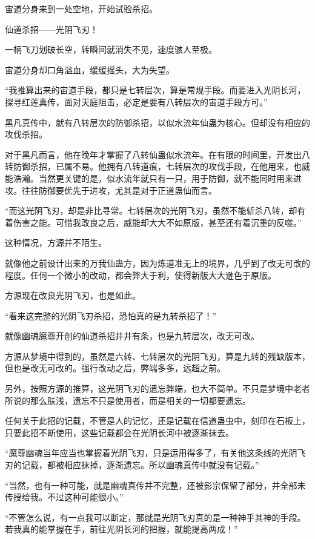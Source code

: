 \begin{this_body}
宙道分身来到一处空地，开始试验杀招。

仙道杀招——光阴飞刃！

一柄飞刀划破长空，转瞬间就消失不见，速度骇人至极。

宙道分身却口角溢血，缓缓摇头，大为失望。

“我推算出来的宙道手段，都只是七转层次，算是常规手段。而要进入光阴长河，探寻红莲真传，面对天庭阻击，必定是要有八转层次的宙道手段方可。”

黑凡真传中，就有八转层次的防御杀招，以似水流年仙蛊为核心。但却没有相应的攻伐杀招。

对于黑凡而言，他在晚年才掌握了八转仙蛊似水流年。在有限的时间里，开发出八转防御杀招，已属不易。他拥有八转道痕，七转层次的攻伐手段，在他用来，也威能浩瀚。当然更关键的是，似水流年就只有一只，用于防御，就不能同时用来进攻。往往防御要优先于进攻，尤其是对于正道蛊仙而言。

“而这光阴飞刃，却是非比寻常。七转层次的光阴飞刃，虽然不能斩杀八转，却有着伤害之能。可惜我改良之后，威能却大大不如原版，甚至还有着沉重的反噬。”

这种情况，方源并不陌生。

就像他之前设计出来的万我仙蛊方，因为炼道准无上的境界，几乎到了改无可改的程度。任何一个微小的改动，都会弊大于利，使得新版大大逊色于原版。

方源现在改良光阴飞刃，也是如此。

“看来这完整的光阴飞刃杀招，恐怕真的是九转杀招了！”

就像幽魂魔尊开创的仙道杀招井井有条，也是九转层次，改无可改。

方源从梦境中得到的，虽然是六转、七转层次的光阴飞刃，算是九转的残缺版本，但也是改无可改的。强行改动之后，弊端多多，远超之前。

另外，按照方源的推算，这光阴飞刃的遗忘弊端，也大不简单。不只是梦境中老者所说的那么肤浅，遗忘不只是使用者，而是相关的一切都要遗忘。

任何关于此招的记载，不管是人的记忆，还是记载在信道蛊虫中，刻印在石板上，只要此招不断使用，这些记载都会在光阴长河中被逐渐抹去。

“魔尊幽魂当年应当也掌握着光阴飞刃，只是运用得多了，有关他这条线的光阴飞刃的记载，都被相应抹掉，逐渐遗忘。所以幽魂真传中就没有记载。”

“当然，也有一种可能，就是幽魂真传并不完整，还被影宗保留了部分，并全部未传授给我。不过这种可能很小。”

“不管怎么说，有一点我可以断定，那就是光阴飞刃真的是一种神乎其神的手段。若我真的能掌握在手，前往光阴长河的把握，就能提高两成！”


\end{this_body}
